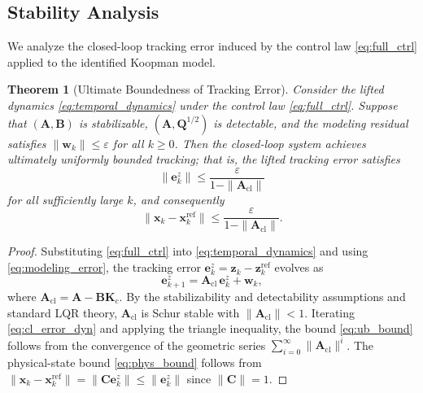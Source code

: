 \documentclass[journal]{IEEEtran}
\newtheorem{theorem}{Theorem}
\newcommand{\vx}{\mathbf{x}}
\newcommand{\vz}{\mathbf{z}}
\newcommand{\vw}{\mathbf{w}}
\newcommand{\ve}{\mathbf{e}}
\newcommand{\mA}{\mathbf{A}}
\newcommand{\mB}{\mathbf{B}}
\newcommand{\mC}{\mathbf{C}}
\newcommand{\mQ}{\mathbf{Q}}
\newcommand{\mK}{\mathbf{K}}
\begin{document}
\subsection{Stability Analysis}
\label{subsec:stability}

We analyze the closed-loop tracking error induced by the control law \eqref{eq:full_ctrl} applied to the identified Koopman model.

\begin{theorem}[Ultimate Boundedness of Tracking Error]
\label{thm:ub}
Consider the lifted dynamics \eqref{eq:temporal_dynamics} under the control law \eqref{eq:full_ctrl}. Suppose that $(\mA, \mB)$ is stabilizable, $(\mA, \mQ^{1/2})$ is detectable, and the modeling residual satisfies $\|\vw_k\| \leq \varepsilon$ for all $k \geq 0$. Then the closed-loop system achieves ultimately uniformly bounded tracking; that is, the lifted tracking error satisfies
\begin{equation}
    \|\ve_k^z\| \leq \frac{\varepsilon}{1 - \|\mA_{\mathrm{cl}}\|}
    \label{eq:ub_bound}
\end{equation}
for all sufficiently large $k$, and consequently
\begin{equation}
    \|\vx_k - \vx_k^{\mathrm{ref}}\| \leq \frac{\varepsilon}{1 - \|\mA_{\mathrm{cl}}\|}.
    \label{eq:phys_bound}
\end{equation}
\end{theorem}

\begin{proof}
Substituting \eqref{eq:full_ctrl} into \eqref{eq:temporal_dynamics} and using \eqref{eq:modeling_error}, the tracking error $\ve_k^z = \vz_k - \vz_k^{\mathrm{ref}}$ evolves as
\begin{equation}
    \ve_{k+1}^z = \mA_{\mathrm{cl}}\, \ve_k^z + \vw_k,
    \label{eq:cl_error_dyn}
\end{equation}
where $\mA_{\mathrm{cl}} = \mA - \mB\mK_c$. By the stabilizability and detectability assumptions and standard LQR theory, $\mA_{\mathrm{cl}}$ is Schur stable with $\|\mA_{\mathrm{cl}}\| < 1$. Iterating \eqref{eq:cl_error_dyn} and applying the triangle inequality, the bound \eqref{eq:ub_bound} follows from the convergence of the geometric series $\sum_{i=0}^{\infty}\|\mA_{\mathrm{cl}}\|^i$. The physical-state bound \eqref{eq:phys_bound} follows from $\|\vx_k - \vx_k^{\mathrm{ref}}\| = \|\mC\ve_k^z\| \leq \|\ve_k^z\|$ since $\|\mC\| = 1$.
\end{proof}
\end{document}
